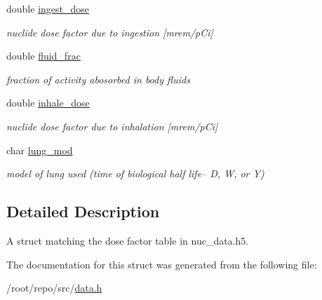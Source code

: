 \begin{DoxyCompactItemize}
\mbox{\label{structpyne_1_1dose_a96dc0ff17888672afb40c82b3c6bb996}} 
double \hyperlink{structpyne_1_1dose_a96dc0ff17888672afb40c82b3c6bb996}{ingest\+\_\+dose}
\begin{DoxyCompactList}\small\item\em nuclide dose factor due to ingestion \mbox{[}mrem/p\+Ci\mbox{]} \end{DoxyCompactList}\item 
\mbox{\label{structpyne_1_1dose_ac5aad706f373cee64e286f6191f753c2}} 
double \hyperlink{structpyne_1_1dose_ac5aad706f373cee64e286f6191f753c2}{fluid\+\_\+frac}
\begin{DoxyCompactList}\small\item\em fraction of activity abosorbed in body fluids \end{DoxyCompactList}\item 
\mbox{\label{structpyne_1_1dose_ade66b3422bf24883142e0de856d67228}} 
double \hyperlink{structpyne_1_1dose_ade66b3422bf24883142e0de856d67228}{inhale\+\_\+dose}
\begin{DoxyCompactList}\small\item\em nuclide dose factor due to inhalation \mbox{[}mrem/p\+Ci\mbox{]} \end{DoxyCompactList}\item 
\mbox{\label{structpyne_1_1dose_afc70c9461a6c1e3348a90e66747db41e}} 
char \hyperlink{structpyne_1_1dose_afc70c9461a6c1e3348a90e66747db41e}{lung\+\_\+mod}
\begin{DoxyCompactList}\small\item\em model of lung used (time of biological half life-- D, W, or Y) \end{DoxyCompactList}\end{DoxyCompactItemize}


\subsection{Detailed Description}
A struct matching the dose factor table in nuc\+\_\+data.\+h5. 

The documentation for this struct was generated from the following file\+:\begin{DoxyCompactItemize}
\item 
/root/repo/src/\hyperlink{data_8h}{data.\+h}\end{DoxyCompactItemize}
